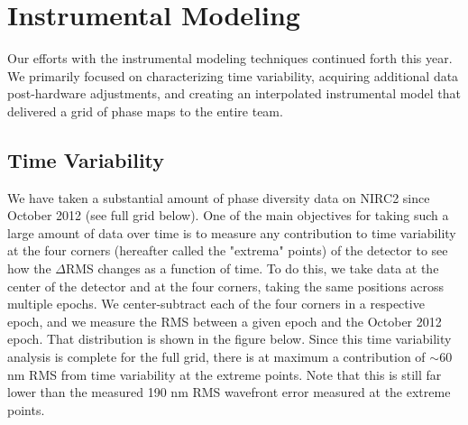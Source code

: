 \section{Instrumental Modeling}
\label{sec:instrument}

Our efforts with the instrumental modeling techniques continued forth
this year. We primarily focused on characterizing time variability,
acquiring additional data post-hardware adjustments, and creating an
interpolated instrumental model that delivered a grid of phase maps to
the entire team. 

\subsection{Time Variability}
We have taken a substantial amount of phase diversity data on NIRC2
since October 2012 (see full grid below). One of the main objectives
for taking such a large amount of data over time is to measure any
contribution to time variability at the four corners (hereafter called
the "extrema" points) of the detector to see how the $\Delta$RMS
changes as a function of time. To do this, we take data at the center
of the detector and at the four corners, taking the same positions
across multiple epochs. We center-subtract each of the four corners in
a respective epoch, and we measure the RMS between a given epoch and
the October 2012 epoch. That distribution is shown in the figure
below. Since this time variability analysis is complete for the full grid, there is at maximum a contribution of $\sim$60 nm RMS from time variability at the extreme points. Note that this is still far lower than the measured 190 nm RMS wavefront error measured at the extreme points.

    
    
    
    
    
    
    
    
    
  
  